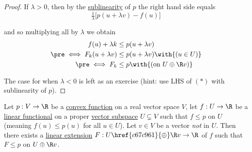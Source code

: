\begin{proof}
  If $\lambda>0$, then by the \href{af3e040}{sublinearity} of $p$ the right
  hand side equals
  $$
    \tfrac1\lambda\bigl[p(u+\lambda v)-f(u)\bigr]
  $$

  and so multiplying all by $\lambda$ we obtain
  \begin{align*}
    f(u)+\lambda k            &\leq p(u+\lambda v)                \\
    \pre\iff F_k(u+\lambda v) &\leq p(u+\lambda v)\with{(u\in U)} \\
    \pre\iff F_k              &\leq p\with{(\text{on }\U)}
  \end{align*}

  The case for when $\lambda<0$ is left as an exercise (hint: use LHS of $(*)$
  with sublinearity of $p$).
\end{proof}

\label{b96b92e}

Let $p:V\to\R$ be a \href{a114065}{convex function} on a real vector space $V$,
let $f:U\to\R$ be a \href{b0b1db8}{linear functional} on a proper
\href{a0f0f06}{vector subspace} $U\subsetneq V$ such that $f\leq p$ on $U$
(meaning $f(u)\leq p(u)$ for all $u\in U$). Let $v\in V$ be a vector
\textit{not} in $U$. Then there exists a \href{c4fd746}{linear extension}
$F:U\href{c67c961}{\oplus}\R v\to\R$ of $f$ such that $F\leq p$ on $U\oplus\R
v$.
